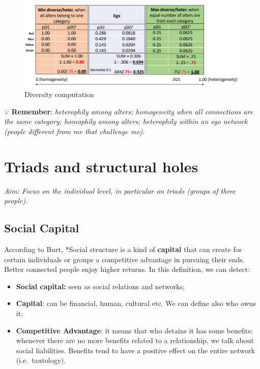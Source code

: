 \documentclass[
  notitlepage,
  onecolumn,
  openany]{book}
\providecommand{\tightlist}{%
  \setlength{\itemsep}{0pt}\setlength{\parskip}{0pt}}
\begin{document}
\begin{figure}[h!]

{\centering \includegraphics[width=0.9\linewidth]{images/06-Attributes based measures/Untitled 6} 

}

\caption{Diversity computation}\label{fig:unnamed-chunk-42}
\end{figure}

💡 \textbf{Remember}:
\emph{heterophily among alters;
homogeneity when all connections are the same category;
homophily among alters;
heterophily within an ego network (people different from me that challenge me).}

\hypertarget{triads-and-structural-holes}{%
\chapter{Triads and structural holes}\label{triads-and-structural-holes}}

\emph{Aim: Focus on the individual level, in particular on triads (groups of
three people).}

\hypertarget{social-capital}{%
\section{Social Capital}\label{social-capital}}

According to Burt, *Social structure is a kind of \textbf{capital} that can
create for certain individuals or groups a competitive advantage in
pursuing their ends. Better connected people enjoy higher returns. In
this definition, we can detect:

\begin{itemize}
\tightlist
\item
  \textbf{Social capital:} seen as social relations and networks;
\item
  \textbf{Capital}: can be financial, human, cultural etc. We can define
  also who owns it;
\item
  \textbf{Competitive Advantage}: it means that who detains it has some
  benefits; whenever there are no more benefits related to a
  relationship, we talk about social liabilities. Benefits tend to
  have a positive effect on the entire network (i.e.~tautology).
\end{itemize}
\end{document}
